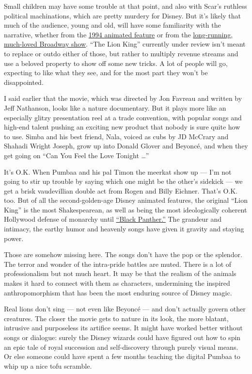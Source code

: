 Small children may have some trouble at that point, and also with Scar's
ruthless political machinations, which are pretty murdery for Disney.
But it's likely that much of the audience, young and old, will have some
familiarity with the narrative, whether from the
\href{https://www.nytimes.com/1994/06/15/movies/review-film-the-hero-within-the-child-within.html}{1994
animated feature} or from the
\href{https://www.nytimes.com/1997/11/14/movies/theater-review-cub-comes-of-age-a-twice-told-cosmic-tale.html}{long-running,
much-loved Broadway show}. ``The Lion King'' currently under review
isn't meant to replace or outdo either of those, but rather to multiply
revenue streams and use a beloved property to show off some new tricks.
A lot of people will go, expecting to like what they see, and for the
most part they won't be disappointed.

I said earlier that the movie, which was directed by Jon Favreau and
written by Jeff Nathanson, looks like a nature documentary. But it plays
more like an especially glitzy presentation reel at a trade convention,
with popular songs and high-end talent pushing an exciting new product
that nobody is sure quite how to use. Simba and his best friend, Nala,
voiced as cubs by JD McCrary and Shahadi Wright Joseph, grow up into
Donald Glover and Beyoncé, and when they get going on ``Can You Feel the
Love Tonight \ldots{}''

It's O.K. When Pumbaa and his pal Timon the meerkat show up --- I'm not
going to stir up trouble by saying which one might be the other's
sidekick --- we get a brisk vaudevillian double act from Rogen and Billy
Eichner. That's O.K. too. But of all the second-golden-age Disney
animated features, the original ``Lion King'' is the most Shakespearean,
as well as being the most ideologically coherent Hollywood defense of
monarchy until
\href{https://www.nytimes.com/2018/02/06/movies/black-panther-review-movie.html}{``Black
Panther.''} The grandeur and intimacy, the earthy humor and heavenly
songs have given it gravity and staying power.

Those are somehow missing here. The songs don't have the pop or the
splendor. The terror and wonder of the intra-pride battles are muted.
There is a lot of professionalism but not much heart. It may be that the
realism of the animals makes it hard to connect with them as characters,
undermining the inspired anthropomorphism that has been the most
enduring source of Disney magic.

Real lions don't sing --- not even like Beyoncé --- and don't actually
govern other creatures. The closer the movie gets to nature in its look,
the more blatant, intrusive and purposeless its artifice seems. It might
have worked better without songs or dialogue: surely the Disney wizards
could have figured out how to spin an epic tale of royal succession and
self-discovery through purely visual means. Or else someone could have
spent a few months teaching the digital Pumbaa to whip up a nice tofu
scramble.

